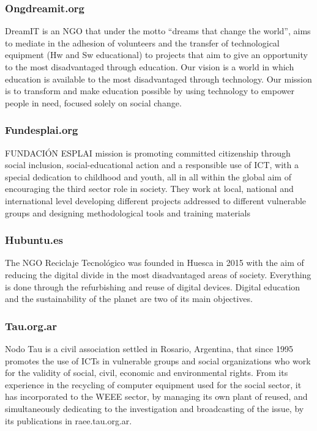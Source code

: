 \documentclass[
]{book}
\begin{document}
\hypertarget{ongdreamit.org}{%
\subsubsection{Ongdreamit.org}\label{ongdreamit.org}}

DreamIT is an NGO that under the motto ``dreams that change the world'', aims to mediate in the adhesion of volunteers and the transfer of technological equipment (Hw and Sw educational) to projects that aim to give an opportunity to the most disadvantaged through education. Our vision is a world in which education is available to the most disadvantaged through technology. Our mission is to transform and make education possible by using technology to empower people in need, focused solely on social change.

\hypertarget{fundesplai.org}{%
\subsubsection{Fundesplai.org}\label{fundesplai.org}}

FUNDACIÓN ESPLAI mission is promoting committed citizenship through social inclusion, social-educational action and a responsible use of ICT, with a special dedication to childhood and youth, all in all within the global aim of encouraging the third sector role in society. They work at local, national and international level developing different projects addressed to different vulnerable groups and designing methodological tools and training materials

\hypertarget{hubuntu.es}{%
\subsubsection{Hubuntu.es}\label{hubuntu.es}}

The NGO Reciclaje Tecnológico was founded in Huesca in 2015 with the aim of reducing the digital divide in the most disadvantaged areas of society. Everything is done through the refurbishing and reuse of digital devices. Digital education and the sustainability of the planet are two of its main objectives.

\hypertarget{tau.org.ar}{%
\subsubsection{Tau.org.ar}\label{tau.org.ar}}

Nodo Tau is a civil association settled in Rosario, Argentina, that since 1995 promotes the use of ICTs in vulnerable groups and social organizations who work for the validity of social, civil, economic and environmental rights. From its experience in the recycling of computer equipment used for the social sector, it has incorporated to the WEEE sector, by managing its own plant of reused, and simultaneously dedicating to the investigation and broadcasting of the issue, by its publications in raee.tau.org.ar.
\end{document}
